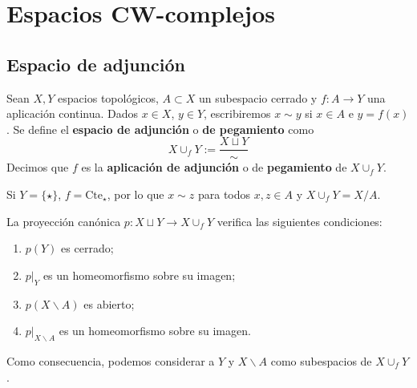 \setchapterpreamble[u]{\margintoc}

\chapter{Espacios CW-complejos} \label{CW}
\section{Espacio de adjunción}
\begin{definition}
Sean $X,Y$ espacios topológicos, $A \subset X$ un subespacio cerrado y
$f\colon A \to Y$ una aplicación continua. Dados $x \in X$, $y \in Y$,
escribiremos $x \sim y$ si $x \in A$ e $y=f(x)$. Se define el
\textbf{espacio de adjunción} o \textbf{de pegamiento} como
\[X \cup_f Y:=\frac{X\sqcup Y}{\sim}\]
Decimos que $f$ es la \textbf{aplicación de adjunción} o de
\textbf{pegamiento} de $X\cup_fY$.
\end{definition}

Si $Y=\{\star\}$, $f=\text{Cte}_\star$, por lo que $x\sim z$ para todos $x,z
\in A$ y $X\cup_f Y=X/A$.

\begin{lemma}
La proyección canónica $p\colon X \sqcup Y \to X\cup_f Y$ verifica las
siguientes condiciones:
\begin{enumerate}
\item $p(Y)$ es cerrado;
\item $p|_Y$ es un homeomorfismo sobre su imagen;
\item $p(X\backslash A)$ es abierto;
\item $p|_{X\backslash A}$ es un homeomorfismo sobre su imagen.
\end{enumerate}
Como consecuencia, podemos considerar a $Y$ y $X\backslash A$ como subespacios
de $X\cup_f Y$.
\end{lemma}



